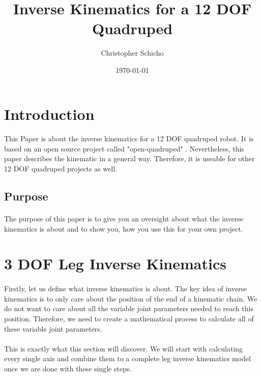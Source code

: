 \documentclass{article}
\title{Inverse Kinematics for a 12 DOF Quadruped}
\author{Christopher Schicho}
\date{\today}
\begin{document}
    \maketitle
    \tableofcontents
    \pagebreak



    \section{Introduction}
    \paragraph{}  
    This Paper is about the inverse kinematics for a 12 DOF quadruped robot. It is based on an open source project called "open-quadruped" . Nevertheless, this paper describes the kinematic in a general way. Therefore, it is useable for other 12 DOF quadruped projects as well. 

    \subsection{Purpose}
    \paragraph{}
    The purpose of this paper is to give you an oversight about what the inverse kinematics is about and to show you, how you use this for your own project.


    
    \section{3 DOF Leg Inverse Kinematics}
    \paragraph{}
    Firstly, let us define what inverse kinematics is about. The key idea of inverse kinematics is to only care about the position of the end of a kinematic chain. We do not want to care about all the variable joint parameters needed to reach this position. Therefore, we need to create a mathematical process to calculate all of these variable joint parameters. 
    \paragraph{}
    This is exactly what this section will discover. We will start with calculating every single axis and combine them to a complete leg inverse kinematics model once we are done with these single steps.
    
\end{document}
